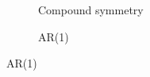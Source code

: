 \documentclass[12pt,a4paper]{article}
\begin{document}
\begin{figure}[h]
\centering
\caption{\footnotesize [TODO].}	
	\begin{subfigure}{.5\textwidth}
	  \centering
	  \caption{Compound symmetry}  
	\end{subfigure}%
	\begin{subfigure}{.5\textwidth}
	  \centering
	  \caption{AR(1)} %
	\end{subfigure}
\end{figure}
\end{document}
